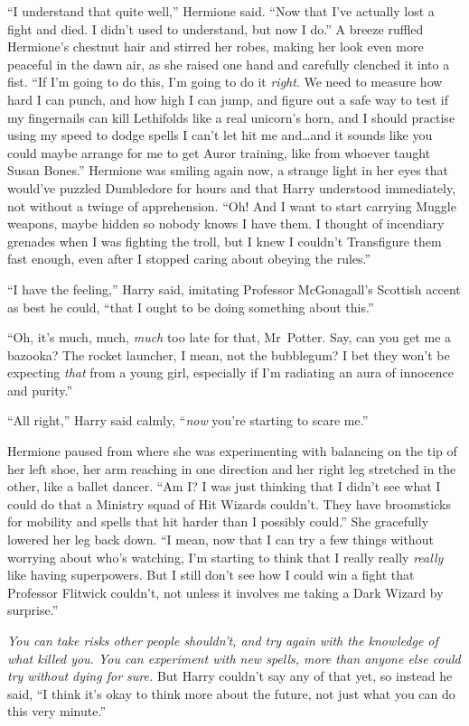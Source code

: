 “I understand that quite well,” Hermione said. “Now that I’ve actually lost a fight and died. I didn’t used to understand, but now I do.” A breeze ruffled Hermione’s chestnut hair and stirred her robes, making her look even more peaceful in the dawn air, as she raised one hand and carefully clenched it into a fist. “If I’m going to do this, I’m going to do it \emph{right}. We need to measure how hard I can punch, and how high I can jump, and figure out a safe way to test if my fingernails can kill Lethifolds like a real unicorn’s horn, and I should practise using my speed to dodge spells I can’t let hit me and…and it sounds like you could maybe arrange for me to get Auror training, like from whoever taught Susan Bones.” Hermione was smiling again now, a strange light in her eyes that would’ve puzzled Dumbledore for hours and that Harry understood immediately, not without a twinge of apprehension. “Oh! And I want to start carrying Muggle weapons, maybe hidden so nobody knows I have them. I thought of incendiary grenades when I was fighting the troll, but I knew I couldn’t Transfigure them fast enough, even after I stopped caring about obeying the rules.”

“I have the feeling,” Harry said, imitating Professor McGonagall’s Scottish accent as best he could, “that I ought to be doing something about this.”

“Oh, it’s much, much, \emph{much} too late for that, Mr~Potter. Say, can you get me a bazooka? The rocket launcher, I mean, not the bubblegum? I bet they won’t be expecting \emph{that} from a young girl, especially if I’m radiating an aura of innocence and purity.”

“All right,” Harry said calmly, “\emph{now} you’re starting to scare me.”

Hermione paused from where she was experimenting with balancing on the tip of her left shoe, her arm reaching in one direction and her right leg stretched in the other, like a ballet dancer. “Am I? I was just thinking that I didn’t see what I could do that a Ministry squad of Hit Wizards couldn’t. They have broomsticks for mobility and spells that hit harder than I possibly could.” She gracefully lowered her leg back down. “I mean, now that I can try a few things without worrying about who’s watching, I’m starting to think that I really really \emph{really} like having superpowers. But I still don’t see how I could win a fight that Professor Flitwick couldn’t, not unless it involves me taking a Dark Wizard by surprise.”

\emph{You can take risks other people shouldn’t, and try again with the knowledge of what killed you. You can experiment with new spells, more than anyone else could try without dying for sure.} But Harry couldn’t say any of that yet, so instead he said, “I think it’s okay to think more about the future, not just what you can do this very minute.”

